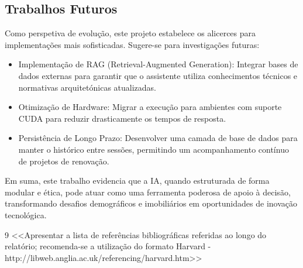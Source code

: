 \documentclass[a4paper,12pt]{scrreprt}
\begin{document}
    \subsection{Trabalhos Futuros}
    Como perspetiva de evolução, este projeto estabelece os alicerces para implementações mais sofisticadas. Sugere-se para investigações futuras:
    \begin{itemize}
        \item Implementação de RAG (Retrieval-Augmented Generation): Integrar bases de dados externas para garantir que o assistente utiliza conhecimentos técnicos e normativas arquitetónicas atualizadas.
        \item Otimização de Hardware: Migrar a execução para ambientes com suporte CUDA para reduzir drasticamente os tempos de resposta.
        \item Persistência de Longo Prazo: Desenvolver uma camada de base de dados para manter o histórico entre sessões, permitindo um acompanhamento contínuo de projetos de renovação.
    \end{itemize}
    Em suma, este trabalho evidencia que a IA, quando estruturada de forma modular e ética, pode atuar como uma ferramenta poderosa de apoio à decisão, transformando desafios demográficos e imobiliários em oportunidades de inovação tecnológica.



\renewcommand\bibname{Referências}

\begin{thebibliography}{9}
<<Apresentar a lista de referências bibliográficas referidas ao longo do relatório; recomenda-se a utilização do formato Harvard - http://libweb.anglia.ac.uk/referencing/harvard.htm>>
\end{thebibliography}

\end{document}
